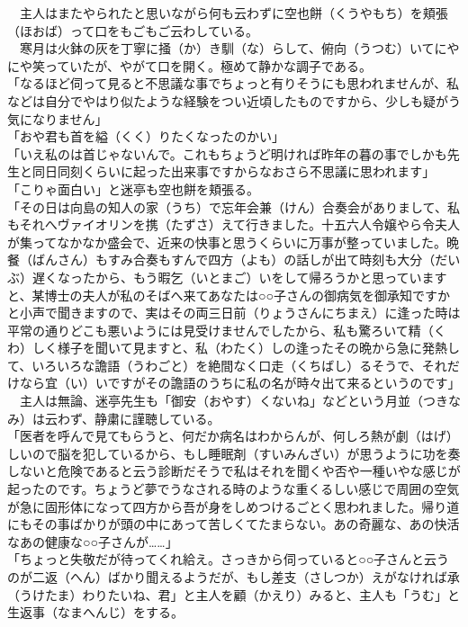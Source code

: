 　主人はまたやられたと思いながら何も云わずに空也餅（くうやもち）を頬張（ほおば）って口をもごもご云わしている。\\
　寒月は火鉢の灰を丁寧に掻（か）き馴（な）らして、俯向（うつむ）いてにやにや笑っていたが、やがて口を開く。極めて静かな調子である。\\
「なるほど伺って見ると不思議な事でちょっと有りそうにも思われませんが、私などは自分でやはり似たような経験をつい近頃したものですから、少しも疑がう気になりません」\\
「おや君も首を縊（くく）りたくなったのかい」\\
「いえ私のは首じゃないんで。これもちょうど明ければ昨年の暮の事でしかも先生と同日同刻くらいに起った出来事ですからなおさら不思議に思われます」\\
「こりゃ面白い」と迷亭も空也餅を頬張る。\\
「その日は向島の知人の家（うち）で忘年会兼（けん）合奏会がありまして、私もそれへヴァイオリンを携（たずさ）えて行きました。十五六人令嬢やら令夫人が集ってなかなか盛会で、近来の快事と思うくらいに万事が整っていました。晩餐（ばんさん）もすみ合奏もすんで四方（よも）の話しが出て時刻も大分（だいぶ）遅くなったから、もう暇乞（いとまご）いをして帰ろうかと思っていますと、某博士の夫人が私のそばへ来てあなたは○○子さんの御病気を御承知ですかと小声で聞きますので、実はその両三日前（りょうさんにちまえ）に逢った時は平常の通りどこも悪いようには見受けませんでしたから、私も驚ろいて精（くわ）しく様子を聞いて見ますと、私（わたく）しの逢ったその晩から急に発熱して、いろいろな譫語（うわごと）を絶間なく口走（くちばし）るそうで、それだけなら宜（い）いですがその譫語のうちに私の名が時々出て来るというのです」\\
　主人は無論、迷亭先生も「御安（おやす）くないね」などという月並（つきなみ）は云わず、静粛に謹聴している。\\
「医者を呼んで見てもらうと、何だか病名はわからんが、何しろ熱が劇（はげ）しいので脳を犯しているから、もし睡眠剤（すいみんざい）が思うように功を奏しないと危険であると云う診断だそうで私はそれを聞くや否や一種いやな感じが起ったのです。ちょうど夢でうなされる時のような重くるしい感じで周囲の空気が急に固形体になって四方から吾が身をしめつけるごとく思われました。帰り道にもその事ばかりが頭の中にあって苦しくてたまらない。あの奇麗な、あの快活なあの健康な○○子さんが\ldots{}\ldots{}」\\
「ちょっと失敬だが待ってくれ給え。さっきから伺っていると○○子さんと云うのが二返（へん）ばかり聞えるようだが、もし差支（さしつか）えがなければ承（うけたま）わりたいね、君」と主人を顧（かえり）みると、主人も「うむ」と生返事（なまへんじ）をする。\\
